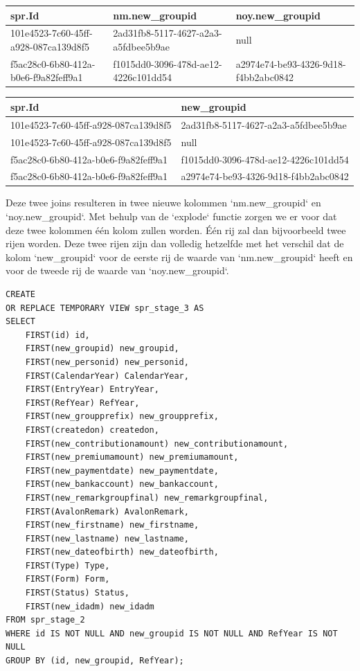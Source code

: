 \begin{center}%
    \begin{tabularx}{0.7\textwidth}{ |X|X|X| }
        \hline
        spr.Id & nm.new\_groupid & noy.new\_groupid \\
        \hline 
        101e4523-7c60-45ff-a928-087ca139d8f5  & 2ad31fb8-5117-4627-a2a3-a5fdbee5b9ae & null  \\
        \hline
        f5ac28c0-6b80-412a-b0e6-f9a82feff9a1 & f1015dd0-3096-478d-ae12-4226c101dd54 & a2974e74-be93-4326-9d18-f4bb2abc0842 \\
        \hline
    \end{tabularx}
    
    \Bigg\downarrow

    \begin{tabularx}{0.7\textwidth}{ |X|X| }
        \hline
        spr.Id & new\_groupid \\
        \hline 
        101e4523-7c60-45ff-a928-087ca139d8f5  & 2ad31fb8-5117-4627-a2a3-a5fdbee5b9ae  \\
        \hline
        101e4523-7c60-45ff-a928-087ca139d8f5  & null  \\
        \hline
        f5ac28c0-6b80-412a-b0e6-f9a82feff9a1 & f1015dd0-3096-478d-ae12-4226c101dd54 \\
        \hline
        f5ac28c0-6b80-412a-b0e6-f9a82feff9a1 & a2974e74-be93-4326-9d18-f4bb2abc0842 \\
        \hline
    \end{tabularx}
\end{center}

Deze twee joins resulteren in twee nieuwe kolommen `nm.new\_groupid` en `noy.new\_groupid`. Met behulp van de `explode` functie zorgen we er voor dat deze twee kolommen één kolom zullen worden. Één rij zal dan bijvoorbeeld twee rijen worden. Deze twee rijen zijn dan volledig hetzelfde met het verschil dat de kolom `new\_groupid` voor de eerste rij de waarde van `nm.new\_groupid` heeft en voor de tweede rij de waarde van `noy.new\_groupid`.


\begin{verbatim}
CREATE 
OR REPLACE TEMPORARY VIEW spr_stage_3 AS 
SELECT 
    FIRST(id) id, 
    FIRST(new_groupid) new_groupid, 
    FIRST(new_personid) new_personid,
    FIRST(CalendarYear) CalendarYear,
    FIRST(EntryYear) EntryYear,
    FIRST(RefYear) RefYear,
    FIRST(new_groupprefix) new_groupprefix,
    FIRST(createdon) createdon,
    FIRST(new_contributionamount) new_contributionamount,
    FIRST(new_premiumamount) new_premiumamount,
    FIRST(new_paymentdate) new_paymentdate,
    FIRST(new_bankaccount) new_bankaccount,
    FIRST(new_remarkgroupfinal) new_remarkgroupfinal,
    FIRST(AvalonRemark) AvalonRemark,
    FIRST(new_firstname) new_firstname,
    FIRST(new_lastname) new_lastname,
    FIRST(new_dateofbirth) new_dateofbirth,
    FIRST(Type) Type,
    FIRST(Form) Form,
    FIRST(Status) Status,
    FIRST(new_idadm) new_idadm
FROM spr_stage_2 
WHERE id IS NOT NULL AND new_groupid IS NOT NULL AND RefYear IS NOT NULL
GROUP BY (id, new_groupid, RefYear);
\end{verbatim}

